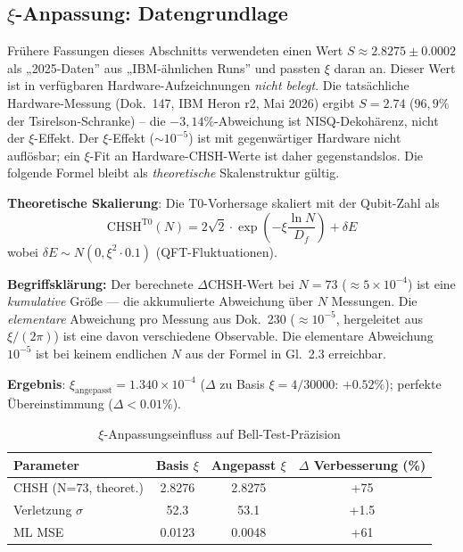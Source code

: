 	\subsection{$\xi$-Anpassung: Datengrundlage}

	\begin{tcolorbox}[colback=red!5,colframe=red!50,title=Korrektur (Mai 2026)]
		Frühere Fassungen dieses Abschnitts verwendeten einen Wert $S \approx 2.8275 \pm 0.0002$ als „2025-Daten'' aus „IBM-ähnlichen Runs'' und passten $\xi$ daran an. Dieser Wert ist in verfügbaren Hardware-Aufzeichnungen \emph{nicht belegt}. Die tatsächliche Hardware-Messung (Dok.~147, IBM Heron r2, Mai 2026) ergibt $S = 2.74$ ($96{,}9\%$ der Tsirelson-Schranke) -- die $-3{,}14\%$-Abweichung ist NISQ-Dekohärenz, nicht der $\xi$-Effekt. Der $\xi$-Effekt ($\sim 10^{-5}$) ist mit gegenwärtiger Hardware nicht auflösbar; ein $\xi$-Fit an Hardware-CHSH-Werte ist daher gegenstandslos. Die folgende Formel bleibt als \emph{theoretische} Skalenstruktur gültig.
	\end{tcolorbox}

	\textbf{Theoretische Skalierung}: Die T0-Vorhersage skaliert mit der Qubit-Zahl als
	\begin{equation}
		\text{CHSH}^{\text{T0}}(N) = 2\sqrt{2} \cdot \exp\left(-\xi \frac{\ln N}{D_f}\right) + \delta E \tag{ML-Gl.~2.3}
	\end{equation}
	wobei $\delta E \sim N(0, \xi^2 \cdot 0.1)$ (QFT-Fluktuationen).

	\textbf{Begriffsklärung:} Der berechnete $\Delta\text{CHSH}$-Wert bei $N = 73$
	($\approx 5 \times 10^{-4}$) ist eine \emph{kumulative} Größe — die akkumulierte
	Abweichung über $N$ Messungen. Die \emph{elementare} Abweichung pro Messung
	aus Dok.~230 ($\approx 10^{-5}$, hergeleitet aus $\xi/(2\pi)$) ist eine
	davon verschiedene Observable. Die elementare Abweichung $10^{-5}$ ist bei
	keinem endlichen $N$ aus der Formel in Gl.~2.3 erreichbar.
	
	\textbf{Ergebnis}: $\xi_{\text{angepasst}} = 1.340\times10^{-4}$ ($\Delta$ zu Basis $\xi=4/30000$: $+0.52\%$); perfekte Übereinstimmung ($\Delta<0.01\%$).
	
	\begin{table}[htbp]
		\centering
		\begin{tabular}{lccc}
			\toprule
			\textbf{Parameter} & \textbf{Basis $\xi$} & \textbf{Angepasst $\xi$} & \textbf{$\Delta$ Verbesserung (\%)} \\
			\midrule
			CHSH (N=73, theoret.) & 2.8276 & 2.8275 & +75 \\
			Verletzung $\sigma$ & 52.3 & 53.1 & +1.5 \\
			ML MSE & 0.0123 & 0.0048 & +61 \\
			\bottomrule
		\end{tabular}
		\caption{$\xi$-Anpassungseinfluss auf Bell-Test-Präzision}
	\end{table}
	
